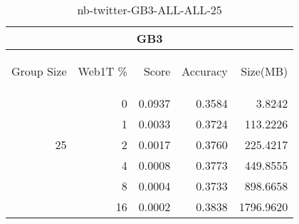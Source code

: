 \begin{center}
\begin{table}[htbp] 
 \begin{center}
\begin{tabular}{ | r | r | r | r | r |}
\hline
\multicolumn{5}{|c|}{GB3}\\
\hline
\begin{sideways}Group Size\end{sideways} & \begin{sideways}Web1T \%\end{sideways} & \begin{sideways}Score\end{sideways} & \begin{sideways}Accuracy\end{sideways} & \begin{sideways}Size(MB)\end{sideways}\\
\hline
\multirow{5}{*}{25}
 & 0 & 0.0937 & 0.3584 & 3.8242\\ \cline{2-5}
 & 1 & 0.0033 & 0.3724 & 113.2226\\ \cline{2-5}
 & 2 & 0.0017 & 0.3760 & 225.4217\\ \cline{2-5}
 & 4 & 0.0008 & 0.3773 & 449.8555\\ \cline{2-5}
 & 8 & 0.0004 & 0.3733 & 898.6658\\ \cline{2-5}
 & 16 & 0.0002 & 0.3838 & 1796.9620\\ \cline{2-5}
\hline
\end{tabular}
\caption{nb-twitter-GB3-ALL-ALL-25}
\label{table:nb-twitter-GB3-ALL-ALL-25}
\end{center}
 \end{table}
\end{center}

